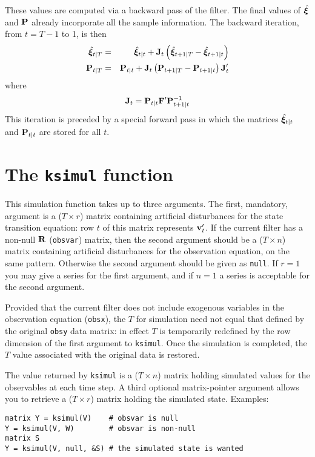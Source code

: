 \documentclass[a4paper]{article}
\newcommand{\obsvar}{\ensuremath\mathbf{R}}
\newcommand{\statevec}{\ensuremath\mathbf{\bm \xi}}
\newcommand{\statemat}{\ensuremath\mathbf{F}}
\newcommand{\strdist}{\ensuremath\mathbf{v}}
\newcommand{\statevar}{\ensuremath\mathbf{P}}
\begin{document}
These values are computed via a backward pass of the filter.  The
final values of $\hat{\statevec}$ and $\statevar$ already incorporate
all the sample information.  The backward iteration, from $t=T-1$ to
1, is then
%
\begin{eqnarray*}
\hat{\statevec}_{t|T} &=& \hat{\statevec}_{t|t} + 
  \mathbf{J}_t\left(\hat{\statevec}_{t+1|T} - \hat{\statevec}_{t+1|t}\right) \\
\statevar_{t|T} &=& \statevar_{t|t} + 
  \mathbf{J}_t\left(\statevar_{t+1|T} - \statevar_{t+1|t}\right) \mathbf{J}_t'
\end{eqnarray*}
%
where
\[
\mathbf{J}_t = \statevar_{t|t} \statemat' \statevar_{t+1|t}^{-1}
\]
%
This iteration is preceded by a special forward pass in which the
matrices $\hat{\statevec}_{t|t}$ and $\statevar_{t|t}$ are stored
for all $t$.


\section{The \texttt{ksimul} function}

This simulation function takes up to three arguments.  The first,
mandatory, argument is a ($T \times r$) matrix containing artificial
disturbances for the state transition equation: row $t$ of this matrix
represents $\strdist_t'$.  If the current filter has a non-null
$\obsvar$ (\texttt{obsvar}) matrix, then the second argument should be
a ($T \times n$) matrix containing artificial disturbances for the
observation equation, on the same pattern.  Otherwise the second
argument should be given as \texttt{null}.  If $r=1$ you may give a
series for the first argument, and if $n=1$ a series is acceptable for
the second argument.

Provided that the current filter does not include exogenous variables
in the observation equation (\texttt{obsx}), the $T$ for simulation
need not equal that defined by the original \texttt{obsy} data matrix:
in effect $T$ is temporarily redefined by the row dimension of the
first argument to \texttt{ksimul}.  Once the simulation is completed,
the $T$ value associated with the original data is restored.

The value returned by \texttt{ksimul} is a ($T \times n$) matrix
holding simulated values for the observables at each time step.  A
third optional matrix-pointer argument allows you to retrieve a ($T
\times r$) matrix holding the simulated state.  Examples:
%
\begin{verbatim}
matrix Y = ksimul(V)    # obsvar is null
Y = ksimul(V, W)        # obsvar is non-null
matrix S
Y = ksimul(V, null, &S) # the simulated state is wanted
\end{verbatim}
\end{document}

